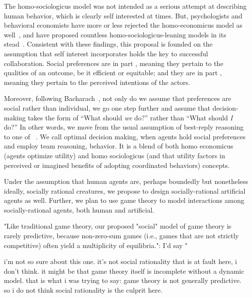 The homo-sociologicus model was not intended as
a serious attempt at describing human behavior, which is clearly self 
interested at times. But, psychologists and behavioral economists have more or less
rejected the homo-economicus model as well~\cite{Kahnemann, etc.},
and have proposed countless
homo-sociologicus-leaning models in its stead~\cite{ADD CITATIONS}.
%
Consistent with these findings, this proposal is founded on the
assumption that self interest incorporates  holds the key to successful
collaboration.
%
Social preferences are in part , meaning they
pertain to the qualities of an outcome, be it efficient or equitable;
and they are in part , meaning they pertain to the
perceived intentions of the actors.

Moreover, following Bacharach~\cite{2006}, not only do we assume that
preferences are social rather than individual, we go one step further
and assume that decision-making takes the form of ``What should
\emph{we\/} do?'' rather than ``What should \emph{I\/} do?''  In other
words, we move from the usual assumption of best-reply reasoning to
one of ~\cite{TEAM REASONING: Bacharach 1999}.
We call optimal decision making, when agents hold social preferences
and employ team reasoning,  behavior.
It is a blend of both homo economicus (agents optimize utility) and 
homo sociologicus (and that utility factors in perceived or imagined 
benefits of adopting coordinated behaviors) concepts.

Under the assumption that human agents are, perhaps boundedly but
nonetheless ideally, socially rational creatures, we propose to design
socially-rational artificial agents as well.  Further, we plan to use
game theory to model interactions among socially-rational agents, both
human and artificial.


"Like traditional game theory, our proposed "social" model of game theory is rarely predictive, because non-zero-sum games (i.e., games that are not strictly competitive) often yield a multiplicity of equilibria.": I'd say "

i'm not so sure about this one. it's not social rationality that is at fault here, i don't think. it might be that game theory itself is incomplete without a dynamic model. that is what i was trying to say: game theory is not generally predictive. so i do not think social rationality is the culprit here.

